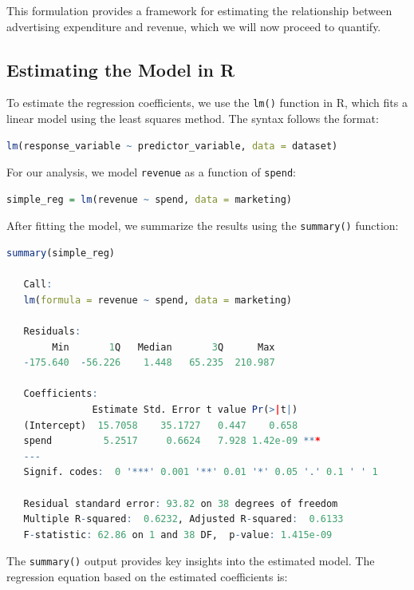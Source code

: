 \documentclass[
  11pt,
]{book}
\newcommand{\passthrough}[1]{#1}
\theoremstyle{definition}
\theoremstyle{definition}
\theoremstyle{definition}
\theoremstyle{definition}
\theoremstyle{remark}
\begin{document}
This formulation provides a framework for estimating the relationship between advertising expenditure and revenue, which we will now proceed to quantify.

\subsection*{Estimating the Model in R}\label{estimating-the-model-in-r}


To estimate the regression coefficients, we use the \passthrough{\lstinline!lm()!} function in R, which fits a linear model using the least squares method. The syntax follows the format:

\begin{lstlisting}[language=R]
lm(response_variable ~ predictor_variable, data = dataset)
\end{lstlisting}

For our analysis, we model \passthrough{\lstinline!revenue!} as a function of \passthrough{\lstinline!spend!}:

\begin{lstlisting}[language=R]
simple_reg = lm(revenue ~ spend, data = marketing)
\end{lstlisting}

After fitting the model, we summarize the results using the \passthrough{\lstinline!summary()!} function:

\begin{lstlisting}[language=R]
summary(simple_reg)
   
   Call:
   lm(formula = revenue ~ spend, data = marketing)
   
   Residuals:
        Min       1Q   Median       3Q      Max 
   -175.640  -56.226    1.448   65.235  210.987 
   
   Coefficients:
               Estimate Std. Error t value Pr(>|t|)    
   (Intercept)  15.7058    35.1727   0.447    0.658    
   spend         5.2517     0.6624   7.928 1.42e-09 ***
   ---
   Signif. codes:  0 '***' 0.001 '**' 0.01 '*' 0.05 '.' 0.1 ' ' 1
   
   Residual standard error: 93.82 on 38 degrees of freedom
   Multiple R-squared:  0.6232, Adjusted R-squared:  0.6133 
   F-statistic: 62.86 on 1 and 38 DF,  p-value: 1.415e-09
\end{lstlisting}

The \passthrough{\lstinline!summary()!} output provides key insights into the estimated model. The regression equation based on the estimated coefficients is:
\end{document}
